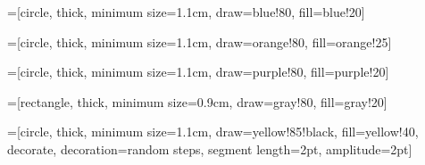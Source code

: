 
\centering%
=[circle,
                                    thick,
                                    minimum size=1.1cm,
                                    draw=blue!80,
                                    fill=blue!20]

=[circle,
                                                thick,
                                                minimum size=1.1cm,
                                                draw=orange!80,
                                                fill=orange!25]

=[circle,
                                    thick,
                                    minimum size=1.1cm,
                                    draw=purple!80,
                                    fill=purple!20]

=[rectangle,
                                    thick,
                                    minimum size=0.9cm,
                                    draw=gray!80,
                                    fill=gray!20]

=[circle,
                                    thick,
                                    minimum size=1.1cm,
                                    draw=yellow!85!black,
                                    fill=yellow!40,
                                    decorate,
                                    decoration={random steps,
                                                            segment length=2pt,
                                                            amplitude=2pt}]

